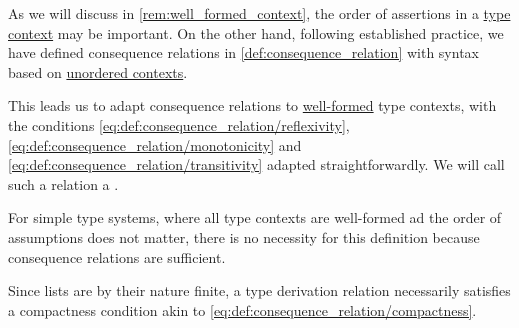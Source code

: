 \begin{definition}\label{def:type_derivation_relation}\mimprovised
  As we will discuss in \cref{rem:well_formed_context}, the order of assertions in a \hyperref[def:type_context]{type context} may be important. On the other hand, following established practice, we have defined consequence relations in \cref{def:consequence_relation} with syntax based on \hyperref[rem:logical_contexts_as_sets]{unordered contexts}.

  This leads us to adapt consequence relations to \hyperref[rem:well_formed_context]{well-formed} type contexts, with the conditions \eqref{eq:def:consequence_relation/reflexivity}, \eqref{eq:def:consequence_relation/monotonicity} and \eqref{eq:def:consequence_relation/transitivity} adapted straightforwardly. We will call such a relation a .
\end{definition}
\begin{comments}
  \item For simple type systems, where all type contexts are well-formed ad the order of assumptions does not matter, there is no necessity for this definition because consequence relations are sufficient.

  \item Since lists are by their nature finite, a type derivation relation necessarily satisfies a compactness condition akin to \eqref{eq:def:consequence_relation/compactness}.
\end{comments}

